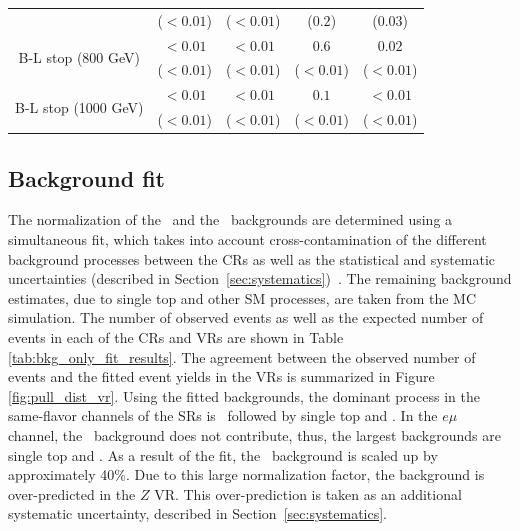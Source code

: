 \begin{table}
{\begin{tabular}{c|cccc}
                                             & ($< 0.01$)                         & ($<0.01$)                          & ($0.2$)                          & ($0.03$) \vspace{1ex} \\
      \multirow{2}{*}{B-L stop (800 GeV)}    & $< 0.01$                           & $< 0.01$                           & $0.6$                            & $0.02$   \\
                                             & ($< 0.01$)                         & ($< 0.01$)                         & ($< 0.01$)                       & ($< 0.01$) \vspace{1ex} \\
      \multirow{2}{*}{B-L stop (1000 GeV)}   & $< 0.01$                           & $< 0.01$                           & $0.1$                            & $< 0.01$                     \\
                                             & ($< 0.01$)                         & ($< 0.01$)                         & ($< 0.01$)                       & ($< 0.01$)
      \vspace{1ex} \\
      \bottomrule
    \end{tabular}

  }
\end{table}

\subsection{Background fit}
\label{sec:bkg_fit}

The normalization of the \TTBAR\ and the \ZGAMMAJETS\ backgrounds are
determined using a simultaneous fit, which takes into account
cross-contamination of the different background processes between the
CRs as well as the statistical and systematic
uncertainties (described in Section~\ref{sec:systematics})~\cite{Baak:2014wma}.
The remaining background estimates, due to  single top and other SM processes,
are taken from the MC simulation.
The number of observed events as well as the expected number
of events in each of the CRs and VRs are shown in
Table \ref{tab:bkg_only_fit_results}.
The agreement between the observed number of events and the fitted event
yields in the VRs is summarized in Figure \ref{fig:pull_dist_vr}.
Using the fitted backgrounds, the dominant process in the same-flavor
channels of the SRs is \ZGAMMAJETS\ followed by single top and
\TTBAR. In the $e\mu$ channel, the \ZGAMMAJETS\ background does
not contribute, thus, the largest backgrounds are single top and \TTBAR.
As a result of the fit, the \ZGAMMAJETS\ background is scaled up by
approximately 40\%. Due to this large normalization factor, the background is
over-predicted in the $Z$ VR. This over-prediction is taken as an additional
systematic uncertainty, described in Section~\ref{sec:systematics}.

